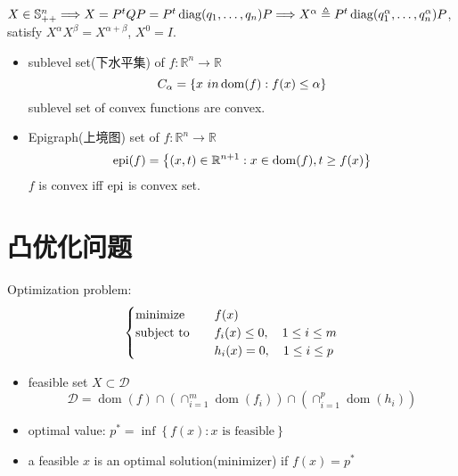 \begin{remark}
    $X \in \mathbb{S}^n_{++} \Longrightarrow  X = P^tQP = P^t\operatorname{diag}(q_1, \dots, q_n)P \Longrightarrow X^\alpha \triangleq P^t\operatorname{diag}(q_1^\alpha, \dots, q_n^\alpha)P$, satisfy $X^\alpha X^\beta = X^{\alpha + \beta}$, $X^0 = I$.
\end{remark}

\begin{remark}
    \text{}
    \begin{itemize}
        \item sublevel set(下水平集) of $f: \mathbb{R}^n \to \mathbb{R}$
        \[C_\alpha = \left\{x \ in \operatorname{dom}(f): f(x) \le \alpha\right\}\] sublevel set of convex functions are convex.
        \item Epigraph(上境图) set of $f: \mathbb{R}^n \to \mathbb{R}$ \[\operatorname{epi}(f) = \left\{(x, t) \in \mathbb{R}^{n + 1}: x \in \operatorname{dom}(f), t \ge f(x)\right\}\] $f$ is convex iff $\operatorname{epi}$ is convex set.
    \end{itemize}
\end{remark}

\section{凸优化问题}
\begin{remark}
    Optimization problem:
    \[\begin{cases}
        \operatorname{minimize} \quad &f(x)\\
        \operatorname{subject\ to} \quad &f_i(x) \le 0, \quad 1 \le i \le m\\
        &h_i(x) = 0, \quad 1 \le i \le p
    \end{cases}\]

    \begin{itemize}
        \item  feasible set $X \subset \mathcal{D}$ \[\mathcal{D}=\operatorname{dom}(f) \cap\left(\cap_{i=1}^{m} \operatorname{dom}\left(f_{i}\right)\right) \cap\left(\cap_{i=1}^{p} \operatorname{dom}\left(h_{i}\right)\right)\]
        \item optimal value: $p^* = \inf\left\{f(x): x \text{ is feasible}\right\}$
        \item a feasible $x$ is an optimal solution(minimizer) if $f(x) = p^*$
    \end{itemize}
\end{remark}

